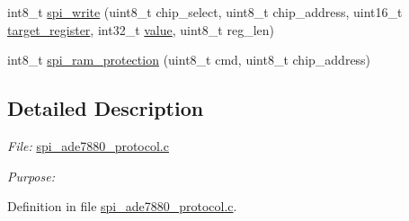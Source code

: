 {\bf }\par
\begin{DoxyCompactItemize}
\item 
int8\-\_\-t \hyperlink{a00007_ga2770219ad8ad1eda1817c0df934b47d0}{spi\-\_\-write} (uint8\-\_\-t chip\-\_\-select, uint8\-\_\-t chip\-\_\-address, uint16\-\_\-t \hyperlink{a00041_ac02048009fa6718e40f028b6bae63f3d}{target\-\_\-register}, int32\-\_\-t \hyperlink{a00041_a638e4503e0ae6ce655b7ad2e17e8f0ad}{value}, uint8\-\_\-t reg\-\_\-len)
\end{DoxyCompactItemize}

{\bf }\par
\begin{DoxyCompactItemize}
\item 
int8\-\_\-t \hyperlink{a00007_gae51aa618efe7af5f3a68ac324f2a7840}{spi\-\_\-ram\-\_\-protection} (uint8\-\_\-t cmd, uint8\-\_\-t chip\-\_\-address)
\begin{DoxyCompactList}\small\item\em 

 \end{DoxyCompactList}\end{DoxyCompactItemize}



\subsection{Detailed Description}
{\itshape File\-:} \hyperlink{a00040}{spi\-\_\-ade7880\-\_\-protocol.\-c} \par
 {\itshape Purpose\-:} \par
 

Definition in file \hyperlink{a00040_source}{spi\-\_\-ade7880\-\_\-protocol.\-c}.

